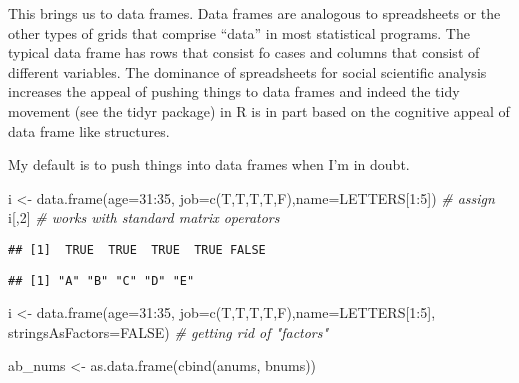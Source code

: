\documentclass[
]{article}
\newenvironment{Shaded}{\begin{snugshade}}{\end{snugshade}}
\newcommand{\AttributeTok}[1]{\textcolor[rgb]{0.77,0.63,0.00}{#1}}
\newcommand{\CommentTok}[1]{\textcolor[rgb]{0.56,0.35,0.01}{\textit{#1}}}
\newcommand{\ConstantTok}[1]{\textcolor[rgb]{0.00,0.00,0.00}{#1}}
\newcommand{\DecValTok}[1]{\textcolor[rgb]{0.00,0.00,0.81}{#1}}
\newcommand{\FunctionTok}[1]{\textcolor[rgb]{0.00,0.00,0.00}{#1}}
\newcommand{\NormalTok}[1]{#1}
\newcommand{\OtherTok}[1]{\textcolor[rgb]{0.56,0.35,0.01}{#1}}
\newcommand{\SpecialCharTok}[1]{\textcolor[rgb]{0.00,0.00,0.00}{#1}}
\begin{document}
This brings us to data frames. Data frames are analogous to spreadsheets
or the other types of grids that comprise ``data'' in most statistical
programs. The typical data frame has rows that consist fo cases and
columns that consist of different variables. The dominance of
spreadsheets for social scientific analysis increases the appeal of
pushing things to data frames and indeed the tidy movement (see the
tidyr package) in R is in part based on the cognitive appeal of data
frame like structures.

My default is to push things into data frames when I'm in doubt.

\begin{Shaded}
\begin{Highlighting}[]
\NormalTok{i }\OtherTok{\textless{}{-}} \FunctionTok{data.frame}\NormalTok{(}\AttributeTok{age=}\DecValTok{31}\SpecialCharTok{:}\DecValTok{35}\NormalTok{, }\AttributeTok{job=}\FunctionTok{c}\NormalTok{(T,T,T,T,F),}\AttributeTok{name=}\NormalTok{LETTERS[}\DecValTok{1}\SpecialCharTok{:}\DecValTok{5}\NormalTok{])  }\CommentTok{\# assign}
\NormalTok{i[,}\DecValTok{2}\NormalTok{]                       }\CommentTok{\# works with standard matrix operators}
\end{Highlighting}
\end{Shaded}

\begin{verbatim}
## [1]  TRUE  TRUE  TRUE  TRUE FALSE
\end{verbatim}

\begin{Shaded}
\end{Shaded}

\begin{verbatim}
## [1] "A" "B" "C" "D" "E"
\end{verbatim}

\begin{Shaded}
\begin{Highlighting}[]
\NormalTok{i }\OtherTok{\textless{}{-}} \FunctionTok{data.frame}\NormalTok{(}\AttributeTok{age=}\DecValTok{31}\SpecialCharTok{:}\DecValTok{35}\NormalTok{, }\AttributeTok{job=}\FunctionTok{c}\NormalTok{(T,T,T,T,F),}\AttributeTok{name=}\NormalTok{LETTERS[}\DecValTok{1}\SpecialCharTok{:}\DecValTok{5}\NormalTok{], }\AttributeTok{stringsAsFactors=}\ConstantTok{FALSE}\NormalTok{)  }\CommentTok{\# getting rid of "factors"}

\NormalTok{ab\_nums }\OtherTok{\textless{}{-}} \FunctionTok{as.data.frame}\NormalTok{(}\FunctionTok{cbind}\NormalTok{(anums, bnums))}
\end{Highlighting}
\end{Shaded}
\end{document}
